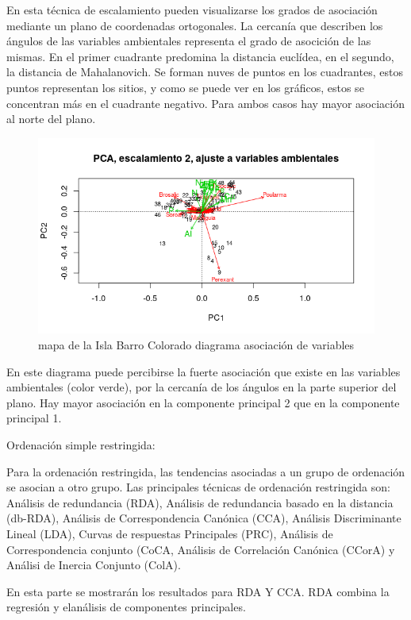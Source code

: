 \documentclass[11pt,]{article}
\begin{document}
En esta técnica de escalamiento pueden visualizarse los grados de
asociación mediante un plano de coordenadas ortogonales. La cercanía que
describen los ángulos de las variables ambientales representa el grado
de asocición de las mismas. En el primer cuadrante predomina la
distancia euclídea, en el segundo, la distancia de Mahalanovich. Se
forman nuves de puntos en los cuadrantes, estos puntos representan los
sitios, y como se puede ver en los gráficos, estos se concentran más en
el cuadrante negativo. Para ambos casos hay mayor asociación al norte
del plano.

\begin{figure}
\centering
\includegraphics[width=1.00000\textwidth]{escalamiento_ajuste_2.png}
\caption{mapa de la Isla Barro Colorado diagrama asociación de
variables\label{fig:bci_map}}
\end{figure}

En este diagrama puede percibirse la fuerte asociación que existe en las
variables ambientales (color verde), por la cercanía de los ángulos en
la parte superior del plano. Hay mayor asociación en la componente
principal 2 que en la componente principal 1.

Ordenación simple restringida:

Para la ordenación restringida, las tendencias asociadas a un grupo de
ordenación se asocian a otro grupo. Las principales técnicas de
ordenación restringida son: Análisis de redundancia (RDA), Análisis de
redundancia basado en la distancia (db-RDA), Análisis de Correspondencia
Canónica (CCA), Análisis Discriminante Lineal (LDA), Curvas de
respuestas Principales (PRC), Análisis de Correspondencia conjunto
(CoCA, Análisis de Correlación Canónica (CCorA) y Análisi de Inercia
Conjunto (ColA).

En esta parte se mostrarán los resultados para RDA Y CCA. RDA combina la
regresión y elanálisis de componentes principales.
\end{document}
